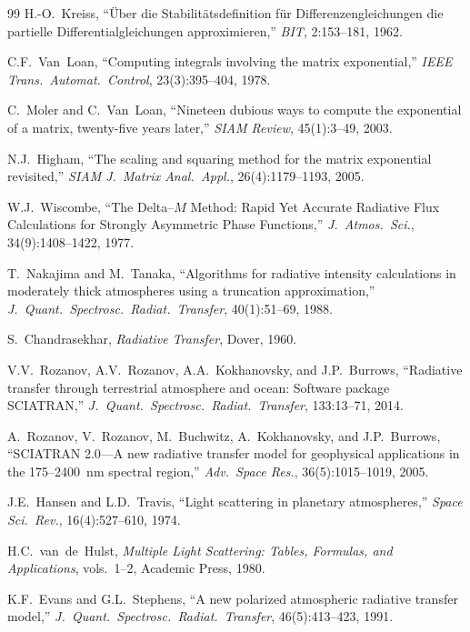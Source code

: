 \documentclass[11pt,a4paper]{article}
\theoremstyle{definition}
\begin{document}
\begin{thebibliography}{99}
H.-O.~Kreiss, ``\"Uber die Stabilit\"atsdefinition f\"ur
Differenzengleichungen die partielle Differentialgleichungen
approximieren,'' \emph{BIT}, 2:153--181, 1962.

C.F.~Van~Loan, ``Computing integrals involving the matrix
exponential,'' \emph{IEEE Trans.\ Automat.\ Control},
23(3):395--404, 1978.

C.~Moler and C.~Van~Loan, ``Nineteen dubious ways to compute the
exponential of a matrix, twenty-five years later,'' \emph{SIAM
Review}, 45(1):3--49, 2003.

N.J.~Higham, ``The scaling and squaring method for the matrix
exponential revisited,'' \emph{SIAM J.\ Matrix Anal.\ Appl.},
26(4):1179--1193, 2005.

W.J.~Wiscombe, ``The Delta--$M$ Method: Rapid Yet Accurate Radiative
Flux Calculations for Strongly Asymmetric Phase Functions,''
\emph{J.\ Atmos.\ Sci.}, 34(9):1408--1422, 1977.

T.~Nakajima and M.~Tanaka, ``Algorithms for radiative intensity
calculations in moderately thick atmospheres using a truncation
approximation,'' \emph{J.\ Quant.\ Spectrosc.\ Radiat.\ Transfer},
40(1):51--69, 1988.

S.~Chandrasekhar, \emph{Radiative Transfer}, Dover, 1960.

V.V.~Rozanov, A.V.~Rozanov, A.A.~Kokhanovsky, and J.P.~Burrows,
``Radiative transfer through terrestrial atmosphere and ocean: Software
package SCIATRAN,'' \emph{J.\ Quant.\ Spectrosc.\ Radiat.\ Transfer},
133:13--71, 2014.

A.~Rozanov, V.~Rozanov, M.~Buchwitz, A.~Kokhanovsky, and
J.P.~Burrows, ``SCIATRAN 2.0---A new radiative transfer model for
geophysical applications in the 175--2400~nm spectral region,''
\emph{Adv.\ Space Res.}, 36(5):1015--1019, 2005.

J.E.~Hansen and L.D.~Travis, ``Light scattering in planetary
atmospheres,'' \emph{Space Sci.\ Rev.}, 16(4):527--610, 1974.

H.C.~van~de~Hulst, \emph{Multiple Light Scattering: Tables, Formulas,
and Applications}, vols.\ 1--2, Academic Press, 1980.

K.F.~Evans and G.L.~Stephens, ``A new polarized atmospheric radiative
transfer model,'' \emph{J.\ Quant.\ Spectrosc.\ Radiat.\ Transfer},
46(5):413--423, 1991.


\end{thebibliography}
\end{document}
